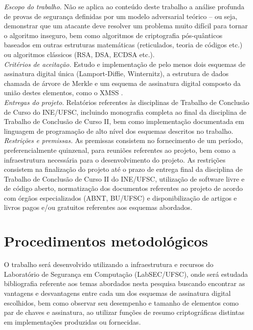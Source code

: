 \documentclass{ufsctex/ufsctex}
\begin{document}
\noindent \emph{Escopo do trabalho.} Não se aplica ao conteúdo deste trabalho
a análise profunda de provas de segurança definidas por um modelo adversarial
teórico -- ou seja, demonstrar que um atacante deve resolver um problema muito
difícil para tornar o algoritmo inseguro, bem como algoritmos de criptografia
pós-quânticos baseados em outras estruturas matemáticas (reticulados, teoria
de códigos etc.) ou algoritmos clássicos (RSA, DSA, ECDSA etc.). \\

\noindent \emph{Critérios de aceitação.} Estudo e implementação de pelo menos
dois esquemas de assinatura digital única (Lamport-Diffie, Winternitz),
a estrutura de dados chamada de árvore de Merkle e um esquema de assinatura
digital composto da união destes elementos, como o XMSS \cite{Buchmann2011}. \\

\noindent \emph{Entregas do projeto.} Relatórios referentes às disciplinas de
Trabalho de Conclusão de Curso do INE/UFSC, incluindo monografia completa ao
final da disciplina de Trabalho de Conclusão de Curso II, bem como
implementação documentada em linguagem de programação de alto nível dos
esquemas descritos no trabalho. \\

\noindent \emph{Restrições e premissas.} As premissas consistem no
fornecimento de um período, preferencialmente quinzenal, para reuniões
referentes ao projeto, bem como a infraestrutura necessária para o
desenvolvimento do projeto. As restrições consistem na finalização do projeto
até o prazo de entrega final da disciplina de Trabalho de Conclusão de Curso II
do INE/UFSC, utilização de software livre e de código aberto, normatização dos
documentos referentes ao projeto de acordo com órgãos especializados (ABNT,
BU/UFSC) e disponibilização de artigos e livros pagos e/ou gratuitos referentes
aos esquemas abordados.

\section{Procedimentos metodológicos}

O trabalho será desenvolvido utilizando a infraestrutura e recursos do
Laboratório de Segurança em Computação (LabSEC/UFSC), onde será estudada
bibliografia referente aos temas abordados nesta pesquisa buscando encontrar
as vantagens e desvantagens entre cada um dos esquemas de assinatura digital
escolhidos, bem como observar seu desempenho e tamanho de elementos como
par de chaves e assinatura, ao utilizar funções de resumo criptográficas
distintas em implementações produzidas ou fornecidas.
\end{document}
